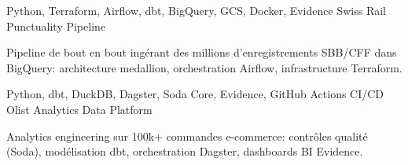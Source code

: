 \begin{cventries}
  \cventry
    {Python, Terraform, Airflow, dbt, BigQuery, GCS, Docker, Evidence}
    {Swiss Rail Punctuality Pipeline}
    {}
    {}
    {
      \begin{cvitems}
        \item {Pipeline de bout en bout ingérant des millions d'enregistrements SBB/CFF dans BigQuery: architecture medallion, orchestration Airflow, infrastructure Terraform.}
      \end{cvitems}
    }

  \cventry
    {Python, dbt, DuckDB, Dagster, Soda Core, Evidence, GitHub Actions CI/CD}
    {Olist Analytics Data Platform}
    {}
    {}
    {
      \begin{cvitems}
        \item {Analytics engineering sur 100k+ commandes e-commerce: contrôles qualité (Soda), modélisation dbt, orchestration Dagster, dashboards BI Evidence.}
      \end{cvitems}
    }
\end{cventries}
